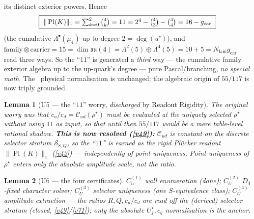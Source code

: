 \documentclass[11pt,a4paper]{article}
\newcommand{\Nfam}{N_{\mathrm{fam}}}
\newcommand{\gcar}{g_{\mathrm{car}}}
\newtheorem{lemma}{Lemma}
\begin{document}
\begin{keybox}
its distinct exterior powers. Hence
\[
  \boxed{\ \|\operatorname{Pl}(K)\|_1=\textstyle\sum_{k=0}^{2}\binom4k=11=2^4-\tbinom43-\tbinom44=16-\gcar\ }
\]
(the cumulative $\Lambda^\bullet(\mu_4)$ up to degree $2=\deg(u^c)$),
and $\text{family}\otimes\text{carrier}=15=\dim\mathfrak{su}(4)=\Lambda^2(5){\oplus}\Lambda^4(5)=10{+}5=\Nfam\gcar$
read three ways. So the ``$11$'' is generated a \emph{third} way --- the cumulative family exterior algebra
up to the up-quark's degree --- pure Pascal/branching, \emph{no special math}. The \mC\ physical
normalisation is unchanged; the algebraic origin of $55/117$ is now triply grounded.
\end{keybox}

\begin{lemma}[U5 --- the ``$11$'' worry, \emph{discharged} by Readout Rigidity]
The original worry was that $c_u/c_d=\mathcal C_{ud}(\rho^\star)$ must be evaluated at the uniquely selected
$\rho^\star$ \emph{without} using $11$ as input, so that until then $55/117$ would be a mere table-level
rational shadow. \textbf{This is now resolved (\vref{v49}):} $\mathcal C_{ud}$ is \emph{constant} on the discrete
selector stratum $\mathcal S_{8,Q}$, so the ``$11$'' is \emph{earned} as the rigid Pl\"ucker readout
$\|\operatorname{Pl}(K)\|_1$ (\vref{v42}) --- \emph{independently} of point-uniqueness. Point-uniqueness of
$\rho^\star$ enters only the \emph{absolute} amplitude scale, not the ratio.
\end{lemma}

\begin{lemma}[U6 --- the four certificates]
$C_U^{(1)}$ wall enumeration (done); $C_U^{(2)}$ $D_4$-fixed character solver; $C_U^{(3)}$ selector
uniqueness (one $S$-equivalence class); $C_U^{(4)}$ amplitude extraction --- the \emph{ratios}
$R,Q,c_u/c_d$ are read off the (derived) selector stratum (closed, \vref{v49}/\vref{v71}); only the \emph{absolute}
$U_f^\star,c_q$ normalisation is the anchor.
\end{lemma}
\end{document}
